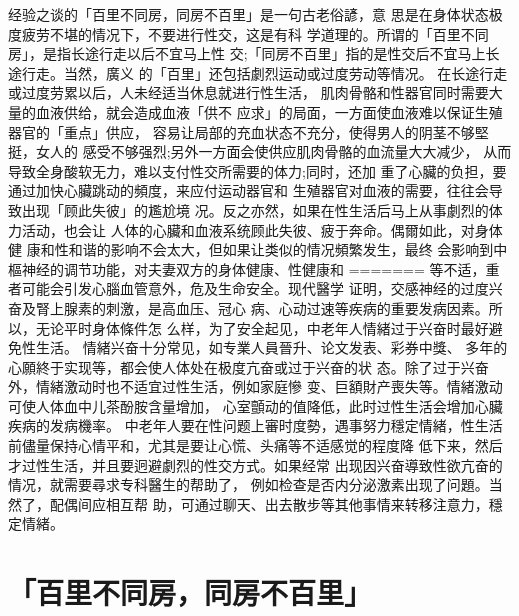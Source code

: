 \documentclass[12pt,UTF8]{ctexbook}
\begin{document}
经验之谈的「百里不同房，同房不百里」是一句古老俗諺，意
思是在身体状态极度疲劳不堪的情况下，不要进行性交，这是有科
学道理的。所谓的「百里不同房」，是指长途行走以后不宜马上性
交;「同房不百里」指的是性交后不宜马上长途行走。当然，廣义
的「百里」还包括劇烈运动或过度劳动等情况。
在长途行走或过度劳累以后，人未经适当休息就进行性生活，
肌肉骨骼和性器官同时需要大量的血液供给，就会造成血液「供不
应求」的局面，一方面使血液难以保证生殖器官的「重点」供应，
容易让局部的充血状态不充分，使得男人的阴茎不够堅挺，女人的
感受不够强烈;另外一方面会使供应肌肉骨骼的血流量大大减少，
从而导致全身酸软无力，难以支付性交所需要的体力;同时，还加
重了心臟的负担，要通过加快心臟跳动的頻度，来应付运动器官和
生殖器官对血液的需要，往往会导致出现「顾此失彼」的尷尬境
况。反之亦然，如果在性生活后马上从事劇烈的体力活动，也会让
人体的心臟和血液系统顾此失彼、疲于奔命。偶爾如此，对身体健
康和性和谐的影响不会太大，但如果让类似的情况頻繁发生，最终
会影响到中樞神经的调节功能，对夫妻双方的身体健康、性健康和
=======
等不适，重者可能会引发心腦血管意外，危及生命安全。现代醫学
证明，交感神经的过度兴奋及腎上腺素的刺激，是高血压、冠心
病、心动过速等疾病的重要发病因素。所以，无论平时身体條件怎
么样，为了安全起见，中老年人情緒过于兴奋时最好避免性生活。
情緒兴奋十分常见，如专業人員晉升、论文发表、彩券中獎、
多年的心願終于实现等，都会使人体处在极度亢奋或过于兴奋的状
态。除了过于兴奋外，情緒激动时也不适宜过性生活，例如家庭慘
变、巨額財产喪失等。情緒激动可使人体血中儿茶酚胺含量增加，
心室顫动的值降低，此时过性生活会增加心臟疾病的发病機率。
中老年人要在性问题上審时度勢，遇事努力穩定情緒，性生活
前儘量保持心情平和，尤其是要让心慌、头痛等不适感觉的程度降
低下来，然后才过性生活，并且要迥避劇烈的性交方式。如果经常
出现因兴奋導致性欲亢奋的情况，就需要尋求专科醫生的帮助了，
例如检查是否内分泌激素出现了问題。当然了，配偶间应相互帮
助，可通过聊天、出去散步等其他事情来转移注意力，穩定情緒。

\section{「百里不同房，同房不百里」}
\end{document}
